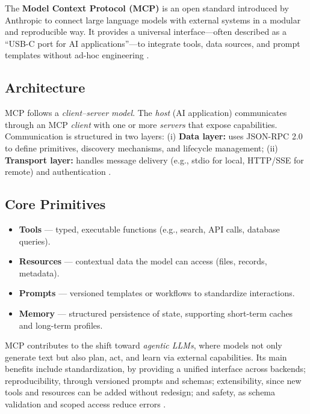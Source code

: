 The \textbf{Model Context Protocol (MCP)} is an open standard introduced by Anthropic to connect large language models with external systems in a modular and reproducible way. It provides a universal interface---often described as a ``USB-C port for AI applications''---to integrate tools, data sources, and prompt templates without ad-hoc engineering \cite{mcp-intro}.

\subsection{Architecture} 
MCP follows a \textit{client--server model}. The \textit{host} (AI application) communicates through an MCP \textit{client} with one or more \textit{servers} that expose capabilities. Communication is structured in two layers:
(i) \textbf{Data layer:} uses JSON-RPC 2.0 to define primitives, discovery mechanisms, and lifecycle management;
(ii) \textbf{Transport layer:} handles message delivery (e.g., stdio for local, HTTP/SSE for remote) and authentication \cite{mcp-architecture}.


\subsection{Core Primitives} 
\begin{itemize}
  \item \textbf{Tools} --- typed, executable functions (e.g., search, API calls, database queries).
  \item \textbf{Resources} --- contextual data the model can access (files, records, metadata).
  \item \textbf{Prompts} --- versioned templates or workflows to standardize interactions.
  \item \textbf{Memory} --- structured persistence of state, supporting short-term caches and long-term profiles.
\end{itemize}

MCP contributes to the shift toward \textit{agentic LLMs}, where models not only generate text but also plan, act, and learn via external capabilities. Its main benefits include standardization, by providing a unified interface across backends; reproducibility, through versioned prompts and schemas; extensibility, since new tools and resources can be added without redesign; and safety, as schema validation and scoped access reduce errors \cite{mcp-spec}.
